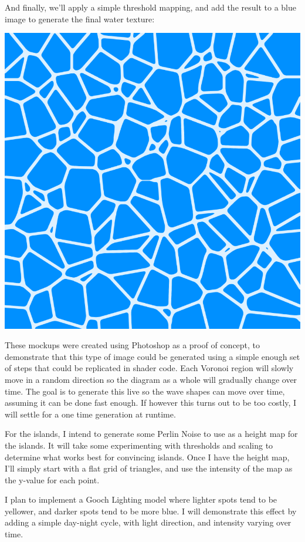 \documentclass {article}
\begin{document}
\begin{description}
And finally, we'll apply a simple threshold mapping, and add the result to a blue image to generate the final water texture:

\includegraphics[scale=0.2]{texture}

\pagebreak

These mockups were created using Photoshop as a proof of concept, to demonstrate that this type of image could be generated using a simple enough set of steps that could be replicated in shader code.  Each Voronoi region will slowly move in a random direction so the diagram as a whole will gradually change over time.  The goal is to generate this live so the wave shapes can move over time, assuming it can be done fast enough.  If however this turns out to be too costly, I will settle for a one time generation at runtime.

For the islands, I intend to generate some Perlin Noise to use as a height map for the islands.  It will take some experimenting with thresholds and scaling to determine what works best for convincing islands.  Once I have the height map, I'll simply start with a flat grid of triangles, and use the intensity of the map as the y-value for each point.

I plan to implement a Gooch Lighting model where lighter spots tend to be yellower, and darker spots tend to be more blue.  I will demonstrate this effect by adding a simple day-night cycle, with light direction, and intensity varying over time.


\end{description}
\end{document}
